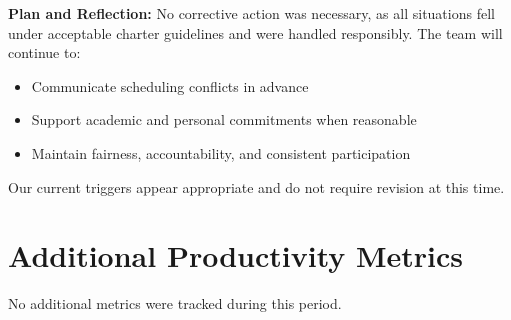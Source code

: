 \documentclass{article}
\begin{document}
\textbf{Plan and Reflection:}
No corrective action was necessary, as all situations fell under acceptable charter guidelines and were handled responsibly. The team will continue to:
\begin{itemize}
\item Communicate scheduling conflicts in advance
\item Support academic and personal commitments when reasonable
\item Maintain fairness, accountability, and consistent participation
\end{itemize}
Our current triggers appear appropriate and do not require revision at this time.


\section{Additional Productivity Metrics}

No additional metrics were tracked during this period.
\end{document}
